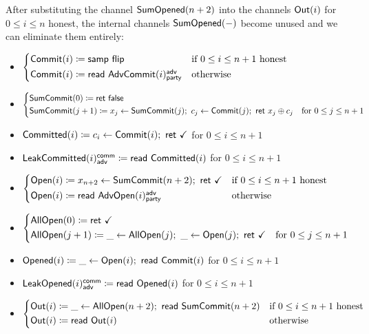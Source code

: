 \noindent After substituting the channel $\mathsf{SumOpened}(n+2)$ into the channels $\mathsf{Out}(i)$ for $0 \leq i \leq n$ honest, the internal channels $\mathsf{SumOpened}(-)$ become unused and we can eliminate them entirely:

\begin{itemize}
\item {\color{blue} $\begin{cases*} \Commit(i) \coloneqq \samp{\flip} & \text{if $0 \leq i \leq n+1$ honest} \\ \Commit(i) \coloneqq \read{\AdvCommit(i)^\adv_\party} & \text{otherwise} \end{cases*}$}
\item {\color{blue} $\begin{cases*} \SumCommit(0) \coloneqq \ret{\false} & \\ \SumCommit(j+1) \coloneqq x_j \leftarrow \SumCommit(j); \ c_j \leftarrow \Commit(j); \ \ret{x_j \oplus c_j} & \text{for $0 \leq j \leq n+1$} \end{cases*}$}
\item {\color{magenta} $\mathsf{Committed}(i) \coloneqq c_i \leftarrow \mathsf{Commit}(i); \ \mathsf{ret} \ \checkmark$ for $0 \leq i \leq n+1$}
\item {\color{magenta} $\mathsf{LeakCommitted}(i)^{\mathsf{comm}}_{\mathsf{adv}} \coloneqq \mathsf{read} \ \mathsf{Committed}(i)$ for $0 \leq i \leq n+1$}
\item {\color{teal} $\begin{cases*} \Open(i) \coloneqq x_{n+2} \leftarrow \SumCommit(n+2); \ \ret{\checkmark} & \text{if $0 \leq i \leq n+1$ honest} \\ \Open(i) \coloneqq \read{\AdvOpen(i)^\adv_\party} & \text{otherwise} \end{cases*}$}
\item {\color{teal} $\begin{cases*} \AllOpen(0) \coloneqq \ret{\checkmark} & \\ \AllOpen(j+1) \coloneqq \_ \leftarrow \AllOpen(j); \ \_ \leftarrow \Open(j); \ \ret{\checkmark} & \text{for $0 \leq j \leq n+1$} \end{cases*}$}
\item {\color{red} $\mathsf{Opened}(i) \coloneqq \_ \leftarrow \mathsf{Open}(i); \ \mathsf{read} \ \mathsf{Commit}(i)$ for $0 \leq i \leq n+1$}
\item {\color{red} $\mathsf{LeakOpened}(i)^{\mathsf{comm}}_{\mathsf{adv}} \coloneqq \mathsf{read} \ \mathsf{Opened}(i)$ for $0 \leq i \leq n+1$}
\item $\begin{cases*} \Out(i) \coloneqq \_ \leftarrow \AllOpen(n+2); \ \read{\SumCommit(n+2)} & \text{if $0 \leq i \leq n+1$ honest} \\ \Out(i) \coloneqq \read{\Out(i)} & \text{otherwise} \end{cases*}$
\end{itemize}

